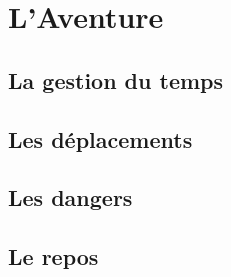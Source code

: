 \chapter{L'Aventure}

\section{La gestion du temps}

\section{Les déplacements}


\section{Les dangers}


\section{Le repos}